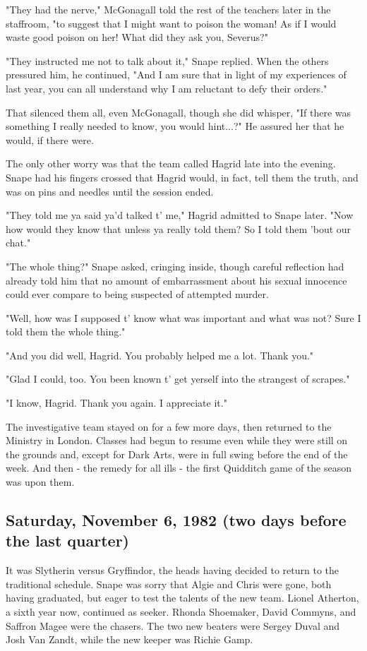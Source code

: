 "They had the nerve," McGonagall told the rest of the teachers later in the staffroom, "to suggest that I might want to poison the woman! As if I would waste good poison on her! What did they ask you, Severus?"

"They instructed me not to talk about it," Snape replied. When the others pressured him, he continued, "And I am sure that in light of my experiences of last year, you can all understand why I am reluctant to defy their orders."

That silenced them all, even McGonagall, though she did whisper, "If there was something I really needed to know, you would hint...?" He assured her that he would, if there were.

The only other worry was that the team called Hagrid late into the evening. Snape had his fingers crossed that Hagrid would, in fact, tell them the truth, and was on pins and needles until the session ended.

"They told me ya said ya'd talked t' me," Hagrid admitted to Snape later. "Now how would they know that unless ya really told them? So I told them 'bout our chat."

"The whole thing?" Snape asked, cringing inside, though careful reflection had already told him that no amount of embarrassment about his sexual innocence could ever compare to being suspected of attempted murder.

"Well, how was I supposed t' know what was important and what was not? Sure I told them the whole thing."

"And you did well, Hagrid. You probably helped me a lot. Thank you."

"Glad I could, too. You been known t' get yerself into the strangest of scrapes."

"I know, Hagrid. Thank you again. I appreciate it."

The investigative team stayed on for a few more days, then returned to the Ministry in London. Classes had begun to resume even while they were still on the grounds and, except for Dark Arts, were in full swing before the end of the week. And then - the remedy for all ills - the first Quidditch game of the season was upon them.

\subsection{Saturday, November 6, 1982 (two days before the last quarter)}

It was Slytherin versus Gryffindor, the heads having decided to return to the traditional schedule. Snape was sorry that Algie and Chris were gone, both having graduated, but eager to test the talents of the new team. Lionel Atherton, a sixth year now, continued as seeker. Rhonda Shoemaker, David Commyns, and Saffron Magee were the chasers. The two new beaters were Sergey Duval and Josh Van Zandt, while the new keeper was Richie Gamp.

